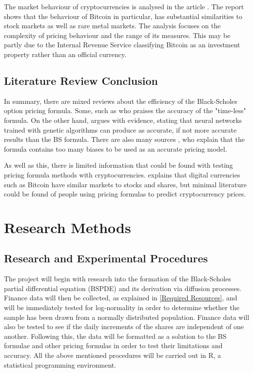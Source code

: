 \documentclass[12pt]{article}
\begin{document}
The market behaviour of cryptocurrencies is analysed in the article \cite{Wilson-Nunn}. The report shows that the behaviour of Bitcoin in particular, has substantial similarities to stock markets as well as rare metal markets. The analysis focuses on the complexity of pricing behaviour and the range of its measures. This may be partly due to the Internal Revenue Service classifying Bitcoin as an investment property rather than an official currency. 


\subsection{Literature Review Conclusion}
In summary, there are mixed reviews about the efficiency of the Black-Scholes option pricing formula. Some, such as \cite{Shinde} who praises the accuracy of the "time-less" formula. On the other hand, \cite{Zapart} argues with evidence, stating that neural networks trained with genetic algorithms can produce as accurate, if not more accurate results than the BS formula. There are also many sources \cite{Rubinstein}, \cite{Lauterbach} who explain that the formula contains too many biases to be used as an accurate pricing model. 

As well as this, there is limited information that could be found with testing pricing formula methods with cryptocurrencies. \cite{Wilson-Nunn} explains that digital currencies such as Bitcoin have similar markets to stocks and shares, but minimal literature could be found of people using pricing formulas to predict cryptocurrency prices. 

\section{Research Methods}
\subsection{Research and Experimental Procedures}
The project will begin with research into the formation of the Black-Scholes partial differential equation (BSPDE) and its derivation via diffusion processes. Finance data will then be collected, as explained in \ref{Required Resources}, and will be immediately tested for log-normality in order to determine whether the sample has been drawn from a normally distributed population. Finance data will also be tested to see if the daily increments of the shares are independent of one another. Following this, the data will be formatted as a solution to the BS formulae and other pricing formulas in order to test their limitations and accuracy. All the above mentioned procedures will be carried out in R, a statistical programming environment.
\end{document}
